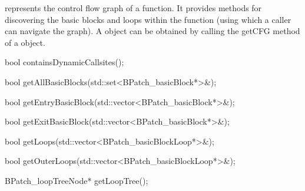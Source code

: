 
 represents the control flow graph of a
function. It provides methods for discovering the
basic blocks and loops within the function (using which a caller can
navigate the graph). A  object
can be obtained by calling the getCFG method of a
 object.

\begin{apient}
  bool containsDynamicCallsites();
\end{apient}


\begin{apient}
  bool getAllBasicBlocks(std::set<BPatch_basicBlock*>&);
\end{apient}


\begin{apient}
  bool getEntryBasicBlock(std::vector<BPatch_basicBlock*>&);
\end{apient}


\begin{apient}
  bool getExitBasicBlock(std::vector<BPatch_basicBlock*>&);
\end{apient}


\begin{apient}
  bool getLoops(std::vector<BPatch_basicBlockLoop*>&);
\end{apient}


\begin{apient}
  bool getOuterLoops(std::vector<BPatch_basicBlockLoop*>&);
\end{apient}


\begin{apient}
  BPatch_loopTreeNode* getLoopTree();
\end{apient}

